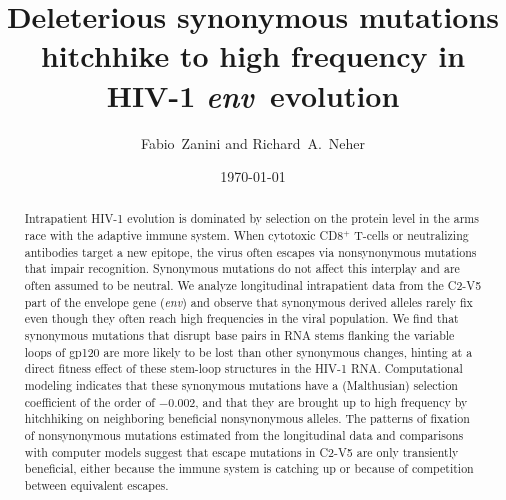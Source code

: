 \documentclass[rmp, twocolumn]{revtex4}
\newcommand{\env}{\textit{env}}
\newcommand{\shankaregion}{C2-V5}
\newcommand{\Author}{Fabio~Zanini and Richard~A.~Neher}
\newcommand{\Title}{Deleterious synonymous mutations hitchhike to high frequency in HIV-1 \env~evolution}
\begin{document}
\title{\Title}
\author{\Author}
\date{\today}

\begin{abstract}
\noindent
Intrapatient HIV-1 evolution is dominated by selection on the protein level in the
arms race with the adaptive immune system. When cytotoxic CD8${}^+$ T-cells or neutralizing antibodies
target a new epitope, the virus often escapes via nonsynonymous mutations that
impair recognition. Synonymous mutations do not affect this interplay and are
often assumed to be neutral.
We analyze longitudinal intrapatient data from the \shankaregion{} part of the
envelope gene (\env{}) and observe that synonymous derived alleles rarely
fix even though they often reach high frequencies in the viral population.
We find that synonymous mutations that disrupt base pairs in RNA stems flanking
the variable loops of gp120 are more likely to be lost than other synonymous
changes, hinting at a direct fitness effect of these stem-loop structures in the
HIV-1 RNA.
Computational modeling indicates that these synonymous mutations have a
(Malthusian) selection coefficient of the order of $-0.002$, and that they are
brought up to high frequency by hitchhiking on neighboring beneficial
nonsynonymous alleles.
The patterns of fixation of nonsynonymous mutations estimated from the
longitudinal data and comparisons with computer models
suggest that escape mutations in \shankaregion{} are only transiently
beneficial, either because the immune system is catching up or because of
competition between equivalent escapes.

\end{abstract}
\maketitle
\end{document}
